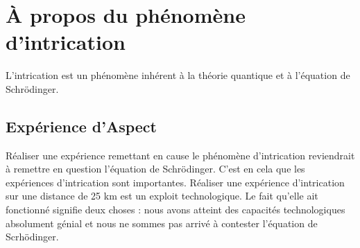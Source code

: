 \section{À propos du phénomène d'intrication}

 L'intrication est un phénomène inhérent à la théorie quantique et à l'équation de Schrödinger.

\subsection{Expérience d'Aspect}

Réaliser une expérience remettant en cause le phénomène d'intrication reviendrait à remettre en question l'équation de Schrödinger. C'est en cela que les expériences d'intrication sont importantes. Réaliser une expérience d'intrication sur une distance de 25 km est un exploit technologique. Le fait qu'elle ait fonctionné signifie deux choses : nous avons atteint des capacités technologiques absolument génial et nous ne sommes pas arrivé à contester l'équation de Scrhödinger. 
